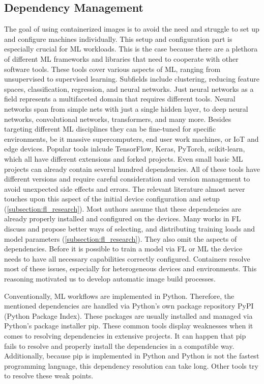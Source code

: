 
\subsection{Dependency Management}
The goal of using containerized images is to avoid the need and struggle to set up and configure machines individually.
This setup and configuration part is especially crucial for ML workloads.
This is the case because there are a plethora of different ML frameworks and libraries that need to cooperate with other software tools.
These tools cover various aspects of ML, ranging from unsupervised to supervised learning.
Subfields include clustering, reducing feature spaces, classification, regression, and neural networks.
Just neural networks as a field represents a multifaceted domain that requires different tools.
Neural networks span from simple nets with just a single hidden layer, to deep neural networks, convolutional networks, transformers, and many more.
Besides targeting different ML disciplines they can be fine-tuned for specific environments, be it massive supercomputers, end user work machines, or IoT and edge devices.
Popular tools inlcude TensorFlow, Keras, PyTorch, scikit-learn, which all have different extensions and forked projects.
Even small basic ML projects can already contain several hundred dependencies.
All of these tools have different versions and require careful consideration and version management to avoid unexpected side effects and errors.
The relevant literature almost never touches upon this aspect of the initial device configuration and setup (\ref{subsection:fl_research}).
Most authors assume that these dependencies are already properly installed and configured on the devices.
Many works in FL discuss and propose better ways of selecting, and distributing training loads and model parameters (\ref{subsection:fl_research}).
They also omit the aspects of dependencies.
Before it is possible to train a model via FL or ML the device needs to have all necessary capabilities correctly configured.
Containers resolve most of these issues, especially for heterogeneous devices and environments.
This reasoning motivated us to develop automatic image build processes.

Conventionally, ML workflows are implemented in Python.
Therefore, the mentioned dependencies are handled via Python's own package repository PyPI (Python Package Index).
These packages are usually installed and managed via Python's package installer pip.
These common tools display weaknesses when it comes to resolving dependencies in extensive projects.
It can happen that pip fails to resolve and properly install the dependencies in a compatible way.
Additionally, because pip is implemented in Python and Python is not the fastest programming language, this dependency resolution can take long.
Other tools try to resolve these weak points.

